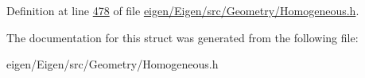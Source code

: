 Definition at line \hyperlink{eigen_2_eigen_2src_2_geometry_2_homogeneous_8h_source_l00478}{478} of file \hyperlink{eigen_2_eigen_2src_2_geometry_2_homogeneous_8h_source}{eigen/\+Eigen/src/\+Geometry/\+Homogeneous.\+h}.



The documentation for this struct was generated from the following file\+:\begin{DoxyCompactItemize}
\item 
eigen/\+Eigen/src/\+Geometry/\+Homogeneous.\+h\end{DoxyCompactItemize}
